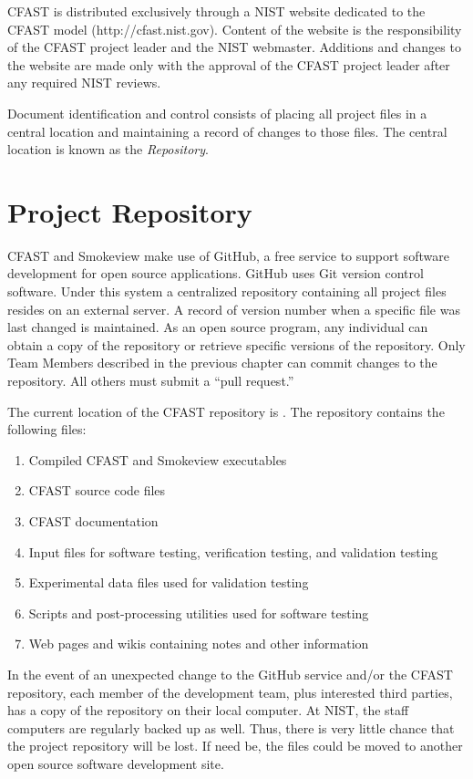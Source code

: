 \documentclass[12pt]{book}
\begin{document}
CFAST is distributed exclusively through a NIST website dedicated to the CFAST model (http://cfast.nist.gov).  Content of the website is the responsibility of the CFAST project leader and the NIST webmaster. Additions and changes to the website are made only with the approval of the CFAST project leader after any required NIST reviews.

Document identification and control consists of placing all project files in a central location and maintaining a record of changes to those files. The central location is known as the {\em Repository}.

\section{Project Repository}

CFAST and Smokeview make use of GitHub, a free service to support software development for open source applications. GitHub uses Git version control software. Under this system a centralized repository containing all project files resides on an external server.   A record of version number when a specific file was last changed is maintained. As an open source program, any individual can obtain a copy of the repository or retrieve specific versions of the repository.  Only Team Members described in the previous chapter can commit changes to the repository. All others must submit a ``pull request.''

The current location of the CFAST repository is \href{https://github.com/firemodels/fds-smv}{}. The repository contains the following files:
\begin{enumerate}
\item Compiled CFAST and Smokeview executables
\item CFAST source code files
\item CFAST documentation
\item Input files for software testing, verification testing, and validation testing
\item Experimental data files used for validation testing
\item Scripts and post-processing utilities used for software testing
\item Web pages and wikis containing notes and other information
\end{enumerate}

In the event of an unexpected change to the GitHub service and/or the CFAST repository, each member of the development team, plus interested third parties, has a copy of the repository on their local computer. At NIST, the staff computers are regularly backed up as well. Thus, there is very little chance that the project repository will be lost. If need be, the files could be moved to another open source software development site.
\end{document}
